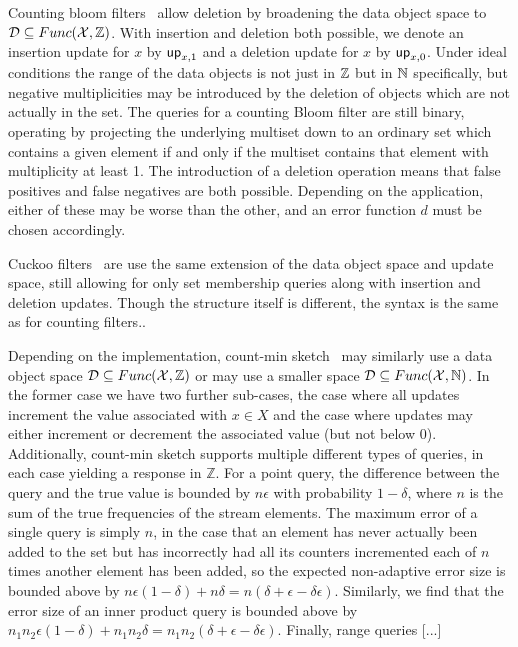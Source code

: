 Counting bloom filters~\cite{xxx} allow deletion by broadening the data object space to $\mathcal{D} \subseteq Func(\mathcal{X},\mathbb{Z})$. With insertion and deletion both possible, we denote an insertion update for $x$ by $\mathsf{up}_{x,1}$ and a deletion update for $x$ by $\mathsf{up}_{x,0}$. Under ideal conditions the range of the data objects is not just in $\mathbb{Z}$ but in $\mathbb{N}$ specifically, but negative multiplicities may be introduced by the deletion of objects which are not actually in the set. The queries for a counting Bloom filter are still binary, operating by projecting the underlying multiset down to an ordinary set which contains a given element if and only if the multiset contains that element with multiplicity at least 1. The introduction of a deletion operation means that false positives and false negatives are both possible. Depending on the application, either of these may be worse than the other, and an error function $d$ must be chosen accordingly.

Cuckoo filters~\cite{xxx} are use the same extension of the data object space and update space, still allowing for only set membership queries along with insertion and deletion updates. Though the structure itself is different, the syntax is the same as for counting filters..

Depending on the implementation, count-min sketch~\cite{xxx} may similarly use a data object space $\mathcal{D} \subseteq Func(\mathcal{X},\mathbb{Z})$ or may use a smaller space $\mathcal{D} \subseteq Func(\mathcal{X},\mathbb{N})$. In the former case we have two further sub-cases, the case where all updates increment the value associated with $x \in X$ and the case where updates may either increment or decrement the associated value (but not below 0). Additionally, count-min sketch supports multiple different types of queries, in each case yielding a response in $\mathbb{Z}$. For a point query, the difference between the query and the true value is bounded by $n\epsilon$ with probability $1-\delta$, where $n$ is the sum of the true frequencies of the stream elements. The maximum error of a single query is simply $n$, in the case that an element has never actually been added to the set but has incorrectly had all its counters incremented each of $n$ times another element has been added, so the expected non-adaptive error size is bounded above by $n\epsilon(1-\delta)+n\delta = n(\delta+\epsilon-\delta\epsilon)$.  Similarly, we find that the error size of an inner product query is bounded above by $n_1n_2\epsilon(1-\delta)+n_1n_2\delta = n_1n_2(\delta+\epsilon-\delta\epsilon)$. Finally, range queries [...]

